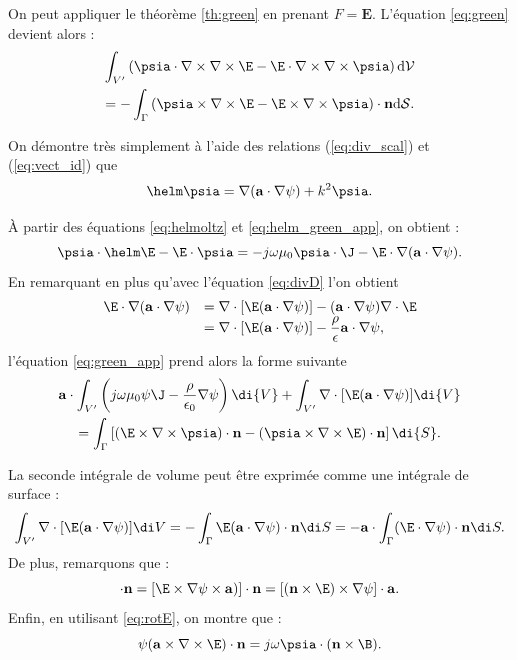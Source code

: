 On peut appliquer le théorème \ref{th:green} en prenant $F = \mathbf E$. L'équation \eqref{eq:green} devient alors :
\begin{multline}
	\label{eq:green_app}
	\int_{V'}\left( \psia\cdot\nabla\times\nabla\times \E -  \E\cdot\nabla\times\nabla\times \psia
	\right)\textrm{d}\mathcal{V} \\= -\int_\Gamma\left(\psia\times\nabla\times \E-\E \times\nabla
	\times \psia\right)\cdot \mathbf n \textrm{d}\mathcal{S}.
\end{multline}

On démontre très simplement à l'aide des relations (\ref{eq:div_scal}) et (\ref{eq:vect_id}) que 
\begin{equation}
	\label{eq:helm_green_app}
	\helm\psia = \nabla(\mathbf{a}\cdot\nabla\psi)+k^2\psia.
\end{equation}

\`A partir des équations \eqref{eq:helmoltz} et \eqref{eq:helm_green_app}, on obtient :
\begin{equation}
	\label{eq:tmp1}
	\psia\cdot\helm\E-\E\cdot\psia
	= -j\omega\mu_0\psia\cdot\J-\E\cdot\nabla(\mathbf a\cdot\nabla\psi).
\end{equation}
%
En remarquant en plus qu'avec l'équation \eqref{eq:divD} l'on obtient 
\begin{equation}
	\label{eq:tmp2}
	\begin{array}{rl}
		\E\cdot\nabla(\mathbf a\cdot\nabla\psi) &= \nabla\cdot[\E(\mathbf a\cdot\nabla\psi)] -
		 (\mathbf a\cdot\nabla\psi)\nabla\cdot\E\\
		&=\nabla\cdot[\E(\mathbf{a}\cdot\nabla\psi)] - \dfrac{\rho}{\epsilon}\mathbf a\cdot\nabla
		\psi,
	\end{array}
\end{equation}
%
l'équation \eqref{eq:green_app} prend alors la forme suivante
\begin{multline}
	\label{eq:tmp3}
	\mathbf a \cdot\int_{V'}\left(j\omega\mu_0\psi\J-\frac{\rho}{\epsilon_0}\nabla\psi\right)\di{V} 
	+ \int_{V'}\nabla\cdot[\E(\mathbf{a}\cdot\nabla\psi)]\di{V} \\
	= \int_\Gamma \left[(\E\times\nabla\times\psia)\cdot\mathbf n-(\psia\times\nabla\times\E)\cdot
	\mathbf{n}\right]\di{S}.
\end{multline}

La seconde intégrale de volume peut être exprimée comme une intégrale de surface :
\begin{equation}
	\int_{V'}\nabla\cdot[\E(\mathbf a\cdot\nabla\psi)]\di V = - \int_\Gamma \E(\mathbf a\cdot\nabla
	\psi)\cdot\mathbf n\di S = - \mathbf{a} \cdot\int_\Gamma (\E\cdot\nabla\psi)\cdot\mathbf n\di S 
	.
\end{equation}
%
De plus, remarquons que :
\begin{equation}
	[\E\times(\nabla\times\psia)]\cdot\mathbf n = [\E\times\nabla\psi\times\mathbf a)]\cdot\mathbf 
	n = [(\mathbf n\times\E)\times\nabla\psi]\cdot\mathbf a.
\end{equation}
%
Enfin, en utilisant \eqref{eq:rotE}, on montre que :
\begin{equation}
	\psi(\mathbf a\times\nabla\times\E)\cdot\mathbf n = j\omega\psia\cdot(\mathbf n\times\B).
\end{equation}

